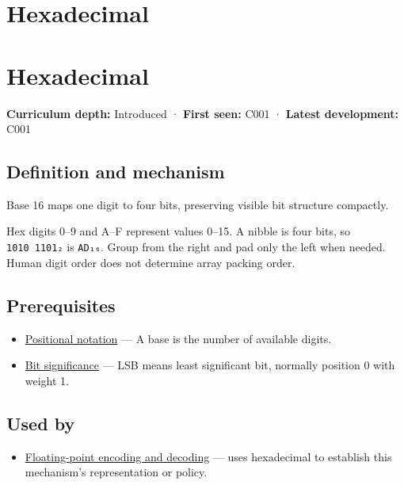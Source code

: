 \hypertarget{appendix-6b8075763724}{}
\section*{Hexadecimal}
\section{Hexadecimal}\label{appendix-6b8075763724-hexadecimal}

\textbf{Curriculum depth:} Introduced · \textbf{First seen:} C001 · \textbf{Latest development:} C001

\subsection{Definition and mechanism}\label{appendix-6b8075763724-definition-and-mechanism}

Base 16 maps one digit to four bits, preserving visible bit structure compactly.

Hex digits 0--9 and A--F represent values 0--15. A nibble is four bits, so \texttt{1010\ 1101₂} is \texttt{AD₁₆}. Group from the right and pad only the left when needed. Human digit order does not determine array packing order.

\subsection{Prerequisites}\label{appendix-6b8075763724-prerequisites}

\begin{itemize}
\tightlist
\item
  \hyperref[appendix-83c3f28f7bda]{Positional notation} --- A base is the number of available digits.
\item
  \hyperref[appendix-280445746493]{Bit significance} --- LSB means least significant bit, normally position 0 with weight 1.
\end{itemize}

\subsection{Used by}\label{appendix-6b8075763724-used-by}

\begin{itemize}
\tightlist
\item
  \hyperref[appendix-6854d0e2218e]{Floating-point encoding and decoding} --- uses hexadecimal to establish this mechanism's representation or policy.
\end{itemize}

